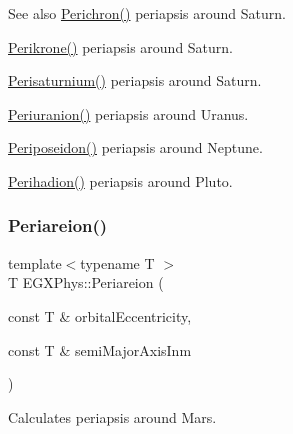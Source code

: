 \begin{DoxySeeAlso}{See also}
\mbox{\hyperlink{group___e_g_x_phys-_periapsis_gae8dfb0b7ebcd117ba94f2d1a7b2e13ad}{Perichron()}} periapsis around Saturn. 

\mbox{\hyperlink{group___e_g_x_phys-_periapsis_ga6b7ae332e74a35cd2c116b4a58204f4b}{Perikrone()}} periapsis around Saturn. 

\mbox{\hyperlink{group___e_g_x_phys-_periapsis_ga9e41853412b564c33a192f7335e4f6fe}{Perisaturnium()}} periapsis around Saturn. 

\mbox{\hyperlink{group___e_g_x_phys-_periapsis_ga655892453dddf80d0e60c66c1b8279fd}{Periuranion()}} periapsis around Uranus. 

\mbox{\hyperlink{group___e_g_x_phys-_periapsis_ga6f36f302670235e04ff91169dde59dbf}{Periposeidon()}} periapsis around Neptune. 

\mbox{\hyperlink{group___e_g_x_phys-_periapsis_ga1b844386674d15f7dc768f81b5770b93}{Perihadion()}} periapsis around Pluto. 
\end{DoxySeeAlso}
\mbox{\label{group___e_g_x_phys-_periapsis_ga27fbf6beeae240a9eeea35dae65b089a}} 
\subsubsection{\texorpdfstring{Periareion()}{Periareion()}}
{\footnotesize\ttfamily template$<$typename T $>$ \\
T E\+G\+X\+Phys\+::\+Periareion (\begin{DoxyParamCaption}\item[{const T \&}]{orbital\+Eccentricity,  }\item[{const T \&}]{semi\+Major\+Axis\+Inm }\end{DoxyParamCaption})}



Calculates periapsis around Mars. 


